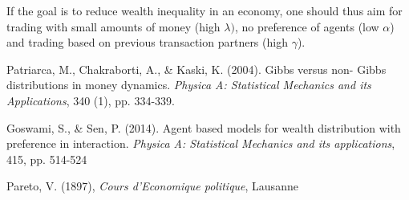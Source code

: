 \documentclass[11pt,a4paper,titlepage]{article}
\begin{document}
If the goal is to reduce wealth inequality in an economy, one should thus aim for trading with small amounts of money (high $\lambda)$, no preference of agents (low $\alpha$) and trading based on previous transaction partners (high $\gamma$).

 


 



\begin{flushleft}
\begin{thebibliography}{}

\singlespacing
\small

  Patriarca, M., Chakraborti, A., \& Kaski, K. (2004). Gibbs versus non-
  Gibbs distributions in money dynamics. \textit{Physica A: Statistical
  Mechanics and its Applications}, 340 (1), pp. 334-339.
 
  Goswami, S., \& Sen, P. (2014). 
  Agent based models for wealth distribution with preference in interaction. 
  \textit{Physica A: Statistical Mechanics and its applications}, 415, pp. 514-524
  
  Pareto, V. (1897), \textit{Cours d'Economique politique}, Lausanne
  

  

  
\end{thebibliography}
\end{flushleft}
\end{document}
